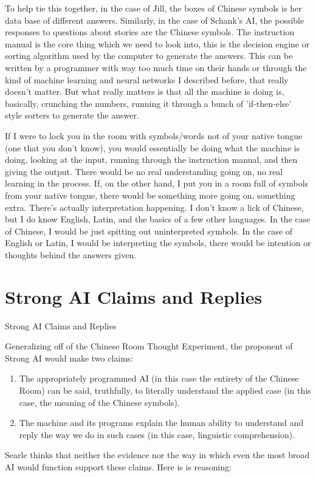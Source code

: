 To help tie this together, in the case of Jill, the boxes of Chinese symbols is her data base of different answers. Similarly, in the case of Schank's AI, the possible responses to questions about stories are the Chinese symbols. The instruction manual is the core thing which we need to look into, this is the decision engine or sorting algorithm used by the computer to generate the answers. This can be written by a programmer with way too much time on their hands or through the kind of machine learning and neural networks I described before, that really doesn't matter. But what really matters is that all the machine is doing is, basically, crunching the numbers, running it through a bunch of 'if-then-else' style sorters to generate the answer.

If I were to lock you in the room with symbols/words not of your native tongue (one that you don't know), you would essentially be doing what the machine is doing, looking at the input, running through the instruction manual, and then giving the output. There would be no real understanding going on, no real learning in the process. If, on the other hand, I put you in a room full of symbols from your native tongue, there would be something more going on, something extra. There's actually interpretation happening. I don't know a lick of Chinese, but I do know English, Latin, and the basics of a few other languages. In the case of Chinese, I would be just spitting out uninterpreted symbols. In the case of English or Latin, I would be interpreting the symbols, there would be intention or thoughts behind the answers given.

\section{Strong AI Claims and Replies}

Strong AI Claims and Replies

Generalizing off of the Chinese Room Thought Experiment, the proponent of Strong AI would make two claims:
\begin{enumerate}
    \item The appropriately programmed AI (in this case the entirety of the Chinese Room) can be said, truthfully, to literally understand the applied case (in this case, the meaning of the Chinese symbols). 
    \item The machine and its programs explain the human ability to understand and reply the way we do in such cases (in this case, linguistic comprehension).
\end{enumerate}
Searle thinks that neither the evidence nor the way in which even the most broad AI would function support these claims. Here is is reasoning:

